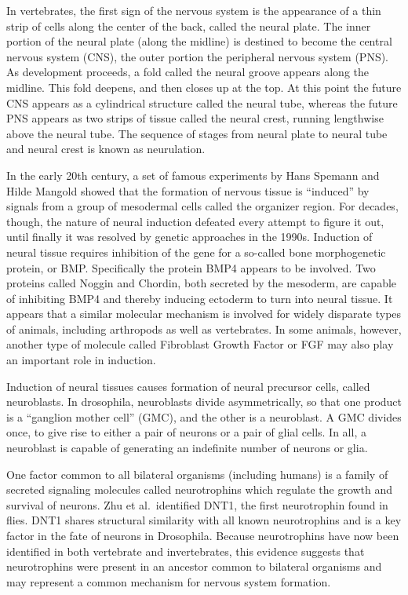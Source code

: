 In vertebrates, the first sign of the nervous system is the appearance of a thin strip of cells along the center of the back, called the neural plate. The inner portion of the neural plate (along the midline) is destined to become the central nervous system (CNS), the outer portion the peripheral nervous system (PNS). As development proceeds, a fold called the neural groove appears along the midline. This fold deepens, and then closes up at the top. At this point the future CNS appears as a cylindrical structure called the neural tube, whereas the future PNS appears as two strips of tissue called the neural crest, running lengthwise above the neural tube. The sequence of stages from neural plate to neural tube and neural crest is known as neurulation.

In the early 20th century, a set of famous experiments by Hans Spemann and Hilde Mangold showed that the formation of nervous tissue is ``induced'' by signals from a group of mesodermal cells called the organizer region. For decades, though, the nature of neural induction defeated every attempt to figure it out, until finally it was resolved by genetic approaches in the 1990s. Induction of neural tissue requires inhibition of the gene for a so-called bone morphogenetic protein, or BMP. Specifically the protein BMP4 appears to be involved. Two proteins called Noggin and Chordin, both secreted by the mesoderm, are capable of inhibiting BMP4 and thereby inducing ectoderm to turn into neural tissue. It appears that a similar molecular mechanism is involved for widely disparate types of animals, including arthropods as well as vertebrates. In some animals, however, another type of molecule called Fibroblast Growth Factor or FGF may also play an important role in induction.

Induction of neural tissues causes formation of neural precursor cells, called neuroblasts. In drosophila, neuroblasts divide asymmetrically, so that one product is a ``ganglion mother cell'' (GMC), and the other is a neuroblast. A GMC divides once, to give rise to either a pair of neurons or a pair of glial cells. In all, a neuroblast is capable of generating an indefinite number of neurons or glia.

One factor common to all bilateral organisms (including humans) is a family of secreted signaling molecules called neurotrophins which regulate the growth and survival of neurons. Zhu et al.~identified DNT1, the first neurotrophin found in flies. DNT1 shares structural similarity with all known neurotrophins and is a key factor in the fate of neurons in Drosophila. Because neurotrophins have now been identified in both vertebrate and invertebrates, this evidence suggests that neurotrophins were present in an ancestor common to bilateral organisms and may represent a common mechanism for nervous system formation.

